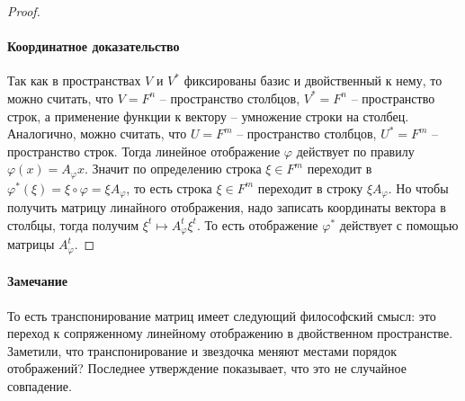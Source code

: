 \begin{proof}
\paragraph{Координатное доказательство}

Так как в пространствах $V$ и $V^*$ фиксированы базис и двойственный к нему, то можно считать, что $V = F^n$ -- пространство столбцов, $V^* = F^n$ -- пространство строк, а применение функции к вектору -- умножение строки на столбец.
Аналогично, можно считать, что $U = F^m$ -- пространство столбцов, $U^*=F^m$ -- пространство строк.
Тогда линейное отображение $\varphi$ действует по правилу $\varphi(x) = A_{\varphi} x$.
Значит по определению строка $\xi \in F^m$ переходит в $\varphi^*(\xi) = \xi \circ \varphi = \xi A_{\varphi}$, то есть строка $\xi\in F^m$ переходит в строку $\xi A_{\varphi}$.
Но чтобы получить матрицу линайного отображения, надо записать координаты вектора в столбцы, тогда получим $\xi^t \mapsto A_{\varphi}^t \xi^t$.
То есть отображение $\varphi^*$ действует с помощью матрицы $A_{\varphi}^t$.

\end{proof}

\paragraph{Замечание}

То есть транспонирование матриц имеет следующий философский смысл: это переход к сопряженному линейному отображению в двойственном пространстве.
Заметили, что транспонирование и звездочка меняют местами порядок отображений?
Последнее утверждение показывает, что это не случайное совпадение.
